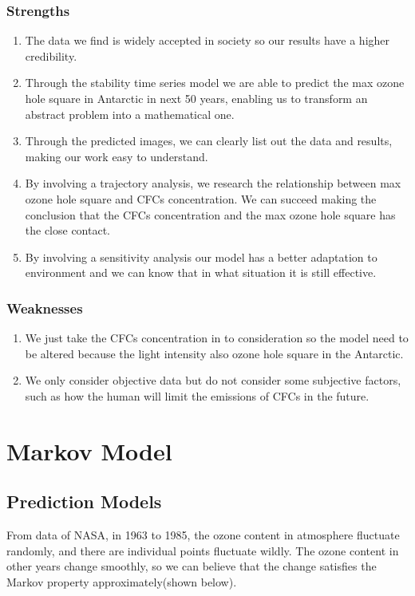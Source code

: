 \documentclass[12pt]{article}
\begin{document}
\subsubsection{Strengths}
\begin{enumerate}
\item The data we find is widely accepted in society so our results have a higher credibility.
\item Through the stability time series model we are able to predict the max ozone hole square in Antarctic in next 50 years, enabling us to transform an abstract problem into a mathematical one.
\item Through the predicted images, we can clearly list out the data and results, making our work easy to understand.
\item By involving a trajectory analysis, we research the relationship between max ozone hole square and CFCs concentration. We can succeed making the conclusion that the CFCs concentration and the max ozone hole square has the close contact.
\item By involving a sensitivity analysis our model has a better adaptation to environment and we can know that in what situation it is still effective.
\end{enumerate}
\subsubsection{Weaknesses}
\begin{enumerate}
\item We just take the CFCs concentration in to consideration so the model need to be altered because the light intensity also ozone hole square in the Antarctic.
\item We only consider objective data but do not consider some subjective factors, such as how the human will limit the emissions of CFCs in the future.
\end{enumerate}


\section{Markov Model}
\subsection{Prediction Models}
From data of NASA, in 1963 to 1985, the ozone content in atmosphere fluctuate randomly, and there are individual points fluctuate wildly. The ozone content in other years change smoothly, so we can believe that the change satisfies the Markov property approximately(shown below).\cite{OzoneHoleWatch}
\end{document}
